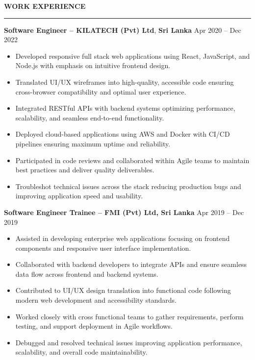 \documentclass[10pt,letterpaper]{article}
\begin{document}
\vspace{8pt}

\textbf{WORK EXPERIENCE}\\[-8pt]
\noindent\rule{\textwidth}{1pt}

\vspace{-2pt}

\textbf{Software Engineer -- KILATECH (Pvt) Ltd}, \textbf{Sri Lanka} \hfill Apr 2020 -- Dec 2022

\vspace{-1pt}

\begin{itemize}
\item Developed responsive full stack web applications using React, JavaScript, and Node.js with emphasis on intuitive frontend design.
\item Translated UI/UX wireframes into high-quality, accessible code ensuring cross-browser compatibility and optimal user experience.
\item Integrated RESTful APIs with backend systems optimizing performance, scalability, and seamless end-to-end functionality.
\item Deployed cloud-based applications using AWS and Docker with CI/CD pipelines ensuring maximum uptime and reliability.
\item Participated in code reviews and collaborated within Agile teams to maintain best practices and deliver quality deliverables.
\item Troubleshot technical issues across the stack reducing production bugs and improving application speed and usability.
\end{itemize}

\textbf{Software Engineer Trainee -- FMI (Pvt) Ltd, Sri Lanka} \hfill Apr 2019 -- Dec 2019

\vspace{-1pt}

\begin{itemize}
\item Assisted in developing enterprise web applications focusing on frontend components and responsive user interface implementation.
\item Collaborated with backend developers to integrate APIs and ensure seamless data flow across frontend and backend systems.
\item Contributed to UI/UX design translation into functional code following modern web development and accessibility standards.
\item Worked closely with cross functional teams to gather requirements, perform testing, and support deployment in Agile workflows.
\item Debugged and resolved technical issues improving application performance, scalability, and overall code maintainability.
\end{itemize}
\end{document}
